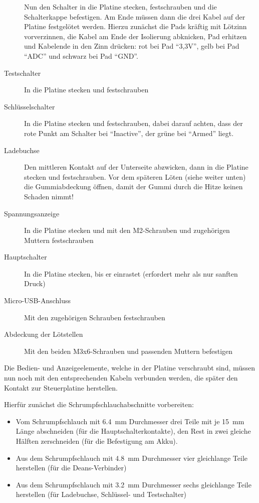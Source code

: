 \documentclass[paper=a4, open=any]{scrbook}
\begin{document}
\begin{description}
					      Nun den Schalter in die Platine stecken, festschrauben und die Schalterkappe befestigen. Am Ende müssen dann die drei Kabel auf der Platine festgelötet werden. Hierzu zunächst die Pads kräftig mit Lötzinn vorverzinnen, die Kabel am Ende der Isolierung abknicken, Pad erhitzen und Kabelende in den Zinn drücken: rot bei Pad \enquote{3,3V}, gelb bei Pad \enquote{ADC} und schwarz bei Pad \enquote{GND}.
					\item [Testschalter] In die Platine stecken und festschrauben
					\item [Schlüsselschalter] In die Platine stecken und festschrauben, dabei darauf achten, dass der rote Punkt am Schalter bei \enquote{Inactive}, der grüne bei \enquote{Armed} liegt.
					\item [Ladebuchse] Den mittleren Kontakt auf der Unterseite abzwicken, dann in die Platine stecken und festschrauben. Vor dem späteren Löten (siehe weiter unten) die Gummiabdeckung öffnen, damit der Gummi durch die Hitze keinen Schaden nimmt!
					\item [Spannungsanzeige] In die Platine stecken und mit den M2-Schrauben und zugehörigen Muttern festschrauben
					\item [Hauptschalter] In die Platine stecken, bis er einrastet (erfordert mehr als nur sanften Druck)
					\item [Micro-USB-Anschluss] Mit den zugehörigen Schrauben festschrauben
					\item [Abdeckung der Lötstellen] Mit den beiden M3x6-Schrauben und passenden Muttern befestigen
				\end{description}

				Die Bedien- und Anzeigeelemente, welche in der Platine verschraubt sind, müssen nun noch mit den entsprechenden Kabeln verbunden werden, die später den Kontakt zur Steuerplatine herstellen.
				
				Hierfür zunächst die Schrumpfschlauchabschnitte vorbereiten:
				\begin{itemize}
					\item Vom Schrumpfschlauch mit \SI{6,4}{\milli\metre} Durchmesser drei Teile mit je \SI{15}{\milli\metre} Länge abschneiden (für die Hauptschalterkontakte), den Rest in zwei gleiche Hälften zerschneiden (für die Befestigung am Akku).
					\item Aus dem Schrumpfschlauch mit \SI{4,8}{\milli\metre} Durchmesser vier gleichlange Teile herstellen (für die Deans-Verbinder)
					\item Aus dem Schrumpfschlauch mit \SI{3,2}{\milli\metre} Durchmesser sechs gleichlange Teile herstellen (für Ladebuchse, Schlüssel- und Testschalter)
				\end{itemize}
\end{document}
